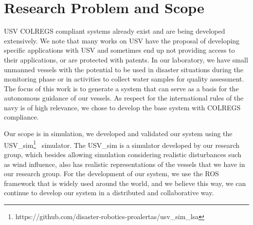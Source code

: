     
    \section{Research Problem and Scope}
    
    
    \ac{USV} \ac{COLREGS} compliant systems already exist and are being developed extensively. We note that many works on \ac{USV} have the proposal of developing specific applications with \ac{USV} and sometimes end up not providing access to their applications, or are protected with patents. In our laboratory, we have small unmanned vessels with the potential to be used in disaster situations during the monitoring phase or in activities to collect water samples for quality assessment. The focus of this work is to generate a system that can serve as a basis for the autonomous guidance of our vessels. As respect for the international rules of the navy is of high relevance, we chose to develop the base system with \ac{COLREGS} compliance.
    
    Our scope is in simulation, we developed and validated our system using the USV\_sim\footnote{https://github.com/disaster-robotics-proalertas/usv\_sim\_lsa}~\cite{Paravisi2018Toward} simulator.
    The USV\_sim is a simulator developed by our research group, which besides allowing simulation considering realistic disturbances such as wind influence, also has realistic representations of the vessels that we have in our research group. For the development of our system, we use the \ac{ROS}~\cite{Quigley2009ROS} framework that is widely used around the world, and we believe this way, we can continue to develop our system in a distributed and collaborative way.
    
    
